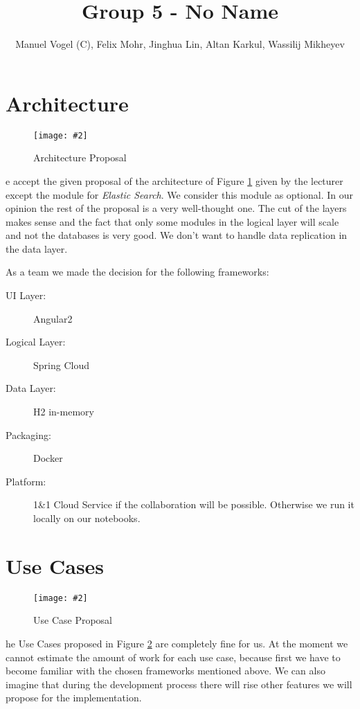 \documentclass[]{article}
\title{Group 5 - \textbf{No Name}}
\author{Manuel Vogel (C), Felix Mohr,  Jinghua Lin,  Altan Karkul, Wassilij Mikheyev}
\newcommand{\cgraphic}[4]
{
	\begin{figure}[htb]
		\begin{center}
		\texttt{[image: \#2]}
		\end{center}
		\caption{#3}
		\label{fig:#2}
	\end{figure}
}%
\begin{document}
	
	\maketitle	

	\section{Architecture}
	\cgraphic{.08}{architecture_proposal}{Architecture Proposal}
	We accept the given proposal of the architecture of Figure \ref{fig:architecture_proposal} given by the lecturer except the module for \textit{Elastic Search}. We consider this module as optional. In our opinion the rest of the proposal is a very well-thought one. The cut of the layers makes sense and the fact that only some modules in the logical layer will scale and not the databases is very good. We don't want to handle data replication in the data layer. 
	
	As a team we made the decision for the following frameworks:
	\begin{description}
		\item[UI Layer:] Angular2
		\item[Logical Layer:] Spring Cloud
		\item[Data Layer:] H2 in-memory
		\item[Packaging:] Docker
		\item[Platform:] 1\&1 Cloud Service if the collaboration will be possible. Otherwise we run it locally on our notebooks.
	\end{description}

	\section{Use Cases}
	\cgraphic{.08}{use_cases_proposal}{Use Case Proposal}
	The Use Cases proposed in Figure \ref{fig:use_cases_proposal} are completely fine for us. At the moment we cannot estimate the amount of work for each use case, because first we have to become familiar with the chosen frameworks mentioned above. We can also imagine that during the development process there will rise other features we will propose for the implementation.
	
\end{document}
